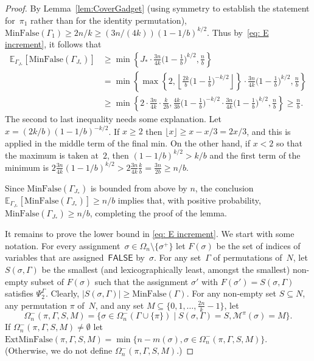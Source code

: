 \documentclass[11pt]{article}
\theoremstyle{definition}
\theoremstyle{remark}
\newcommand{\E}{\mathbb{E}}
\def\FALSE{\mathsf{FALSE}}
\def\notalltrue{\Omega_n^-}
\def\minfalse{\mathrm{MinFalse}}
\def\smallsetfalse{S}
\def\extminfalse{\mathrm{ExtMinFalse}}
\begin{document}
\begin{proof}
By Lemma~\ref{lem:CoverGadget}
(using symmetry to establish the statement for~$\pi_1$ rather than for the identity permutation),
$\minfalse(\Gamma_1) \geq 2n/k \geq  
(3n/(4k))
(1-1/b)^{k/2}$.
Thus by~\eqref{eq: E increment}, it follows that 
\begin{align*}
        \E_{\Gamma_{J_*}}[\minfalse(\Gamma_{J_*})] &\ge  \min\left\{J_* \cdot \frac{3n}{4k} \big(1-\frac{1}{b}\big)^{k/2}, \frac{n}{b} \right\}\\
        &= \min\left\{ \max\left\{ 2, \left\lfloor \frac{2k}{b}\big(1-\frac{1}{b}\big)^{-k/2}\right\rfloor\right\} \cdot \frac{3n}{4k} \big(1-\frac{1}{b}\big)^{k/2}, \frac{n}{b} \right\} \\
        &\ge \min\left\{ 
            2\cdot \frac{3n}{4k}\cdot \frac{k}{2b}, 
            \frac{4k}{3b}\big(1-\frac{1}{b}\big)^{-k/2}\cdot \frac{3n}{4k} \big(1-\frac{1}{b}\big)^{k/2}
            ,\frac{n}{b}
        \right\}  \ge \frac{n}{b}.
    \end{align*}
The second to last inequality needs some explanation. Let $x = (2k/b)(1-1/b)^{-k/2}$. If $x\geq 2$ then $\lfloor x \rfloor \geq x-x/3 = 2x/3$, and this is applied in the middle term of the final min. On the other hand, if $x<2$  
so that the maximum is taken at~$2$, then $(1-1/b)^{k/2} > k/b$ and the first term of the minimum is
$2 \frac{3n}{4k} (1-1/b)^{k/2} >
2 \frac{3n}{4k} \frac{k}{b} = \frac{3n}{2b}\geq n/b$.

Since   $\minfalse(\Gamma_{J_*})$ is bounded from above by $n$, 
the conclusion 
$ \E_{\Gamma_{J_*}}[\minfalse(\Gamma_{J_*})] \geq n/b$ implies that, with positive probability,  $\minfalse(\Gamma_{J_*}) \ge n/b$, completing the proof of the lemma.
    
It remains to prove the lower bound in \eqref{eq: E increment}. We start with some notation.
For every assignment~$\sigma \in \Omega_n\setminus \{\sigma^+\}$ 
let $F(\sigma)$ be the set of indices of variables that are assigned~$\FALSE$ by~$\sigma$. 
For any set~$\Gamma$ of permutations of~$N$, let  $\smallsetfalse(\sigma, \Gamma)$ 
be the smallest (and lexicographically least, amongst the smallest) non-empty subset of $F(\sigma)$ 
such that the assignment $\sigma'$ with 
$F(\sigma') = \smallsetfalse(\sigma,\Gamma)$ satisfies $\Psi_2^{\Gamma}$. 
Clearly, 
$|\smallsetfalse(\sigma,\Gamma)| \geq \minfalse(\Gamma)$.
For any non-empty set $\smallsetfalse \subseteq N$,    any permutation $\pi$ of~$N$, and any set   $ M\subseteq \{0,1,\dots, \frac{2n}{k}-1\}$,
let \[\notalltrue(\pi,\Gamma, \smallsetfalse, M) = \{ \sigma \in \notalltrue(\Gamma\cup \{\pi\}) \mid \smallsetfalse(\sigma,\Gamma) = \smallsetfalse, \mathcal{M}^\pi(\sigma)=M\}.\]
If $\notalltrue(\pi,\Gamma, \smallsetfalse, M) \neq \emptyset$ let $\extminfalse(\pi,\Gamma,\smallsetfalse,M) = \min \{ n- m(\sigma), \sigma \in \notalltrue(\pi,\Gamma,\smallsetfalse,M)\}$.
(Otherwise, we do not define $\notalltrue(\pi,\Gamma,\smallsetfalse, M)$.)
 



\end{proof}
\end{document}
